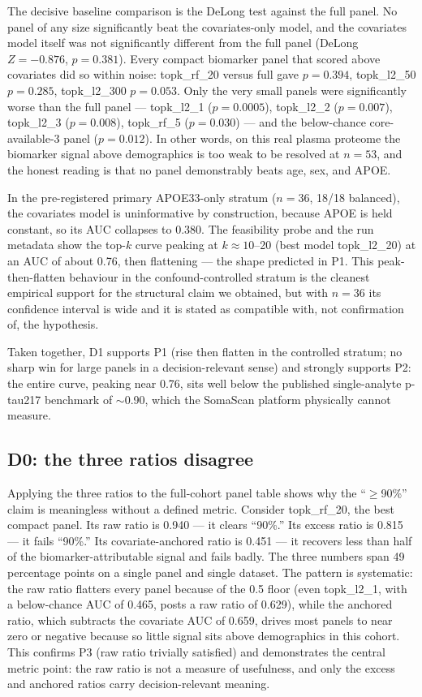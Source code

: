 \documentclass{article}
\begin{document}
The decisive baseline comparison is the DeLong test against the full panel. No
panel of any size significantly beat the covariates-only model, and the
covariates model itself was not significantly different from the full panel
(DeLong $Z=-0.876$, $p=0.381$). Every compact biomarker panel that scored above
covariates did so within noise: topk\_rf\_20 versus full gave $p=0.394$,
topk\_l2\_50 $p=0.285$, topk\_l2\_300 $p=0.053$. Only the very small panels were
significantly worse than the full panel --- topk\_l2\_1 ($p=0.0005$),
topk\_l2\_2 ($p=0.007$), topk\_l2\_3 ($p=0.008$), topk\_rf\_5 ($p=0.030$) ---
and the below-chance core-available-3 panel ($p=0.012$). In other words, on
this real plasma proteome the biomarker signal above demographics is too weak
to be resolved at $n=53$, and the honest reading is that no panel demonstrably
beats age, sex, and APOE.

In the pre-registered primary APOE33-only stratum ($n=36$, 18/18 balanced), the
covariates model is uninformative by construction, because APOE is held
constant, so its AUC collapses to 0.380. The feasibility probe and the run
metadata show the top-$k$ curve peaking at $k\approx10$--20 (best model
topk\_l2\_20) at an AUC of about 0.76, then flattening --- the shape predicted
in P1. This peak-then-flatten behaviour in the confound-controlled stratum is
the cleanest empirical support for the structural claim we obtained, but with
$n=36$ its confidence interval is wide and it is stated as compatible with, not
confirmation of, the hypothesis.

Taken together, D1 supports P1 (rise then flatten in the controlled stratum; no
sharp win for large panels in a decision-relevant sense) and strongly supports
P2: the entire curve, peaking near 0.76, sits well below the published
single-analyte p-tau217 benchmark of $\sim$0.90, which the SomaScan platform
physically cannot measure.

\subsection{D0: the three ratios disagree}

Applying the three ratios to the full-cohort panel table shows why the
``$\geq$90\%'' claim is meaningless without a defined metric. Consider
topk\_rf\_20, the best compact panel. Its raw ratio is 0.940 --- it clears
``90\%.'' Its excess ratio is 0.815 --- it fails ``90\%.'' Its
covariate-anchored ratio is 0.451 --- it recovers less than half of the
biomarker-attributable signal and fails badly. The three numbers span 49
percentage points on a single panel and single dataset. The pattern is
systematic: the raw ratio flatters every panel because of the 0.5 floor (even
topk\_l2\_1, with a below-chance AUC of 0.465, posts a raw ratio of 0.629),
while the anchored ratio, which subtracts the covariate AUC of 0.659, drives
most panels to near zero or negative because so little signal sits above
demographics in this cohort. This confirms P3 (raw ratio trivially satisfied)
and demonstrates the central metric point: the raw ratio is not a measure of
usefulness, and only the excess and anchored ratios carry decision-relevant
meaning.
\end{document}
